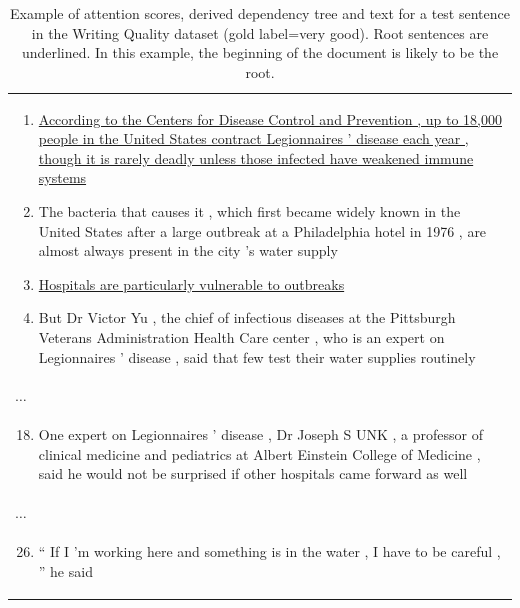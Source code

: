 \begin{landscape}
\begin{table}[h!]
\begin{center}
\begin{tabular}{p{21cm}}
\begin{enumerate}[topsep=-5pt, noitemsep,leftmargin=*]
      \item \uline{According to the Centers for Disease Control and Prevention , up to 18,000 people in the United States contract Legionnaires ' disease each year , though it is rarely deadly unless those infected have weakened immune systems} 
      \item The bacteria that causes it , which first became widely known in the United States after a large outbreak at a Philadelphia hotel in 1976 , are almost always present in the city 's water supply 
      \item \uline{Hospitals are particularly vulnerable to outbreaks} 
      \item But Dr Victor Yu , the chief of infectious diseases at the Pittsburgh Veterans Administration Health Care center , who is an expert on Legionnaires ' disease , said that few test their water supplies routinely \end{enumerate}\\
      \vspace{-2.4em}$\ldots$\\
      \vspace{-2em}
     \begin{enumerate}[topsep=-5pt, noitemsep,leftmargin=*]
     \setcounter{enumi}{17}
      \item  One expert on Legionnaires ' disease , Dr Joseph S UNK , a professor of clinical medicine and pediatrics at Albert Einstein College of Medicine , said he would not be surprised if other hospitals came forward as well 
      \end{enumerate}\\
      \vspace{-2.4em}$\ldots$\\
      \vspace{-2em}
     \begin{enumerate}[topsep=-5pt, noitemsep,leftmargin=*]
     \setcounter{enumi}{25}
      \item `` If I 'm working here and something is in the water , I have to be careful , '' he said \vspace{-1.2em}
      \end{enumerate}\\
      \bottomrule
      \end{tabular}
      \caption{Example of attention scores, derived dependency tree and text for a test sentence in the Writing Quality dataset (gold label=very good). Root sentences are underlined. In this example, the beginning of the document is likely to be the root.}
      \label{tab:latent_writing}
      \end{center}
      \end{table}
\end{landscape}

